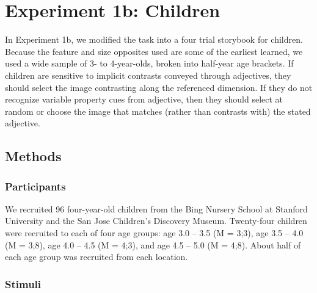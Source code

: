 \documentclass[10pt,letterpaper]{article}
\begin{document}





\section{Experiment 1b: Children} 

In Experiment 1b, we modified the task into a four trial storybook for children.  Because the feature and size opposites used are some of the earliest learned, we used a wide sample of 3- to 4-year-olds, broken into half-year age brackets.    If children are sensitive to implicit contrasts conveyed through adjectives, they should select the image contrasting along the referenced dimension.  If they do not recognize variable property cues from adjective, then they should select at random or choose the image that matches (rather than contrasts with) the stated adjective. 

\subsection{Methods}

\subsubsection{Participants}

We recruited 96 four-year-old children from the Bing Nursery School at Stanford University and the San Jose Children's Discovery Museum.  Twenty-four children were recruited to each of four age groups: age 3.0 -- 3.5 (M = 3;3), age 3.5 -- 4.0 (M = 3;8), age 4.0 -- 4.5 (M = 4;3), and age 4.5 -- 5.0 (M = 4;8).  About half of each age group was recruited from each location.

\subsubsection{Stimuli}
\end{document}
